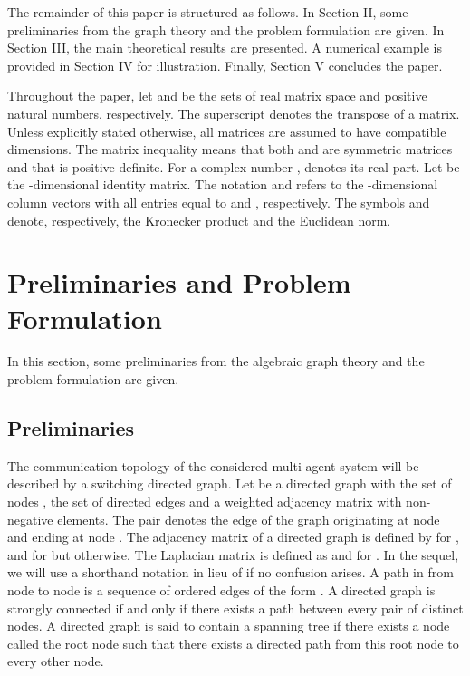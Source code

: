 \documentclass[letterpaper, 10 pt, conference]{ieeeconf}
\begin{document}
\par

The remainder of this paper is structured as follows. In
Section II, some preliminaries from the graph theory and
the problem formulation are given. In Section III, the main
theoretical results are presented. A numerical example is provided in Section
IV for illustration. Finally, Section V concludes the paper.

\par
Throughout the paper, let  and  be the sets of  real
matrix space and positive natural numbers, respectively. The superscript
 denotes the transpose of a
matrix. Unless explicitly stated otherwise,
  all matrices are assumed to have
compatible dimensions. The matrix inequality  means that both  and 
are symmetric matrices and that  is positive-definite. For a complex
number , 
  denotes its real part.
Let  be the -dimensional identity matrix. The notation
 and  refers to the -dimensional column
vectors with all entries equal to  and , respectively.
The symbols  and  denote, respectively, the Kronecker
product and the Euclidean norm.

\section{Preliminaries and Problem Formulation}

In this section, some preliminaries from the algebraic graph theory and the
problem formulation are given.
\subsection{Preliminaries}
The communication topology of the considered multi-agent system will be
described by a switching directed graph.
Let  be a directed graph with the set of nodes , the set of
directed edges   and a weighted adjacency matrix
 with non-negative elements. The pair
 denotes the edge
of the graph 
originating at node  and ending at node .
The adjacency matrix   of a directed
graph  is defined by
  for ,  and  for  but  otherwise. The Laplacian matrix  is defined as  
and    for  . In the sequel, we will
use a shorthand notation  in lieu of
 if no confusion
arises.  A path in
 from node  to node  is a sequence
of ordered edges of the form  .
A directed graph is strongly connected if and only if there exists a path
between every pair of distinct nodes.  A directed
graph is said to contain a spanning tree if there
exists a node called the root node such
that there exists a
directed path from this root node to every
other node.
\end{document}
